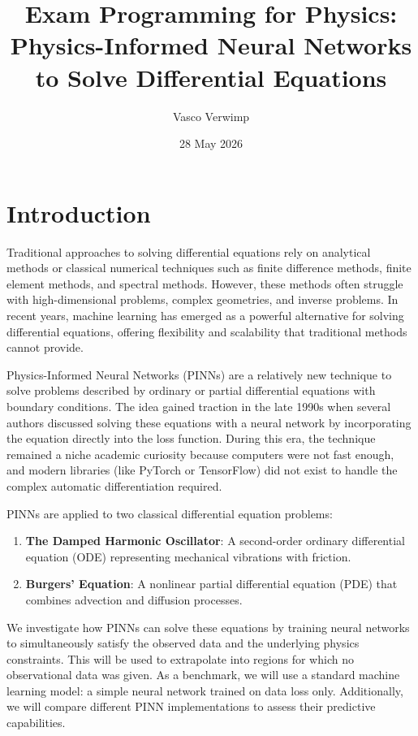 \documentclass[12pt, a4paper]{report}
\title{\textbf{Exam Programming for Physics:\\Physics-Informed Neural Networks to Solve Differential Equations}}
\author{Vasco Verwimp}
\date{28 May 2026}
\begin{document}
\maketitle

\tableofcontents
\newpage


\chapter{Introduction}

Traditional approaches to solving differential equations rely on analytical methods or classical numerical techniques such as finite difference methods, finite element methods, and spectral methods. However, these methods often struggle with high-dimensional problems, complex geometries, and inverse problems. In recent years, machine learning has emerged as a powerful alternative for solving differential equations, offering flexibility and scalability that traditional methods cannot provide.

Physics-Informed Neural Networks (PINNs) are a relatively new technique to solve problems described by ordinary or partial differential equations with boundary conditions. The idea gained traction in the late 1990s when several authors discussed solving these equations with a neural network by incorporating the equation directly into the loss function. During this era, the technique remained a niche academic curiosity because computers were not fast enough, and modern libraries (like PyTorch or TensorFlow) did not exist to handle the complex automatic differentiation required.

PINNs are applied to two classical differential equation problems:

\begin{enumerate}
    \item \textbf{The Damped Harmonic Oscillator}: A second-order ordinary differential equation (ODE) representing mechanical vibrations with friction.
    \item \textbf{Burgers' Equation}: A nonlinear partial differential equation (PDE) that combines advection and diffusion processes.
\end{enumerate}

We investigate how PINNs can solve these equations by training neural networks to simultaneously satisfy the observed data and the underlying physics constraints. This will be used to extrapolate into regions for which no observational data was given. As a benchmark, we will use a standard machine learning model: a simple neural network trained on data loss only. Additionally, we will compare different PINN implementations to assess their predictive capabilities.
\end{document}
